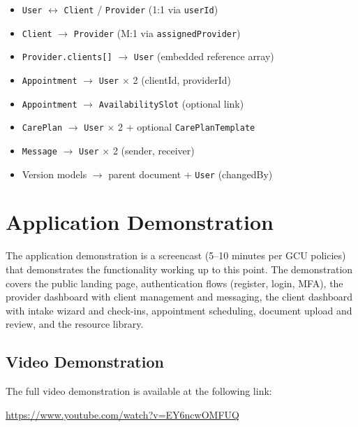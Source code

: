 \documentclass[12pt,letterpaper]{article}
\begin{document}
\begin{itemize}[nosep]
  \item \texttt{User} $\longleftrightarrow$ \texttt{Client} / \texttt{Provider} (1:1 via \texttt{userId})
  \item \texttt{Client} $\longrightarrow$ \texttt{Provider} (M:1 via \texttt{assignedProvider})
  \item \texttt{Provider.clients[]} $\longrightarrow$ \texttt{User} (embedded reference array)
  \item \texttt{Appointment} $\longrightarrow$ \texttt{User} $\times$ 2 (clientId, providerId)
  \item \texttt{Appointment} $\longrightarrow$ \texttt{AvailabilitySlot} (optional link)
  \item \texttt{CarePlan} $\longrightarrow$ \texttt{User} $\times$ 2 + optional \texttt{CarePlanTemplate}
  \item \texttt{Message} $\longrightarrow$ \texttt{User} $\times$ 2 (sender, receiver)
  \item Version models $\longrightarrow$ parent document + \texttt{User} (changedBy)
\end{itemize}

\section{Application Demonstration}

The application demonstration is a screencast (5--10 minutes per GCU policies) that demonstrates the functionality working up to this point. The demonstration covers the public landing page, authentication flows (register, login, MFA), the provider dashboard with client management and messaging, the client dashboard with intake wizard and check-ins, appointment scheduling, document upload and review, and the resource library.

\subsection{Video Demonstration}

The full video demonstration is available at the following link:

\begin{center}
\url{https://www.youtube.com/watch?v=EY6ncwOMFUQ}
\end{center}
\end{document}
